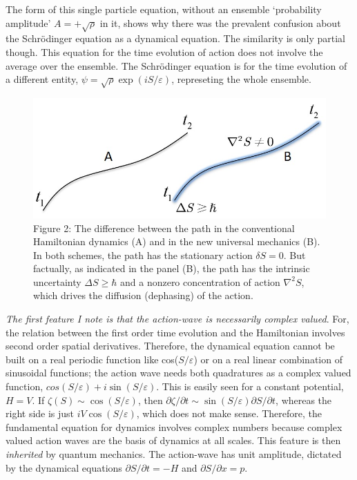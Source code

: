 The form of this single particle equation, without an ensemble `probability amplitude'
$A = + \sqrt{\rho}$ in it, shows why there was the prevalent confusion about the Schr\"{o}dinger equation
as a dynamical equation. The similarity is only partial though. This equation for the
time evolution of action does not involve the average over the ensemble. The Schr\"{o}dinger
equation is for the time evolution of a different entity, $\psi = \sqrt{\rho} \exp(iS/\varepsilon)$, represeting the
whole ensemble.
\begin{figure}[H]
\centering
\includegraphics[scale=0.65]{src/images/chap27/2.jpg}
\captionsetup{singlelinecheck = false, format= hang, justification=raggedright, font=footnotesize, labelsep=space}
\caption*{Figure 2: The difference between the path in the conventional Hamiltonian dynamics (A) and in
the new universal mechanics (B). In both schemes, the path has the stationary action $\delta S = 0$.
But factually, as indicated in the panel (B), the path has the intrinsic uncertainty $\Delta S \geq \hbar$ and a
nonzero concentration of action $\nabla^2 S$, which drives the diffusion (dephasing) of the action.}
\end{figure}

\textit{The first feature I note is that the action-wave is necessarily complex valued}. For, the relation between the first order time evolution and the Hamiltonian involves second order spatial
derivatives. Therefore, the dynamical equation cannot be built on a real periodic function
like cos($S/\varepsilon$) or on a real linear combination of sinusoidal functions; the action wave needs
both quadratures as a complex valued function, $cos(S/\varepsilon) + i \sin(S/\varepsilon)$. This is easily seen for
a constant potential, $H = V$. If $\zeta(S) \sim \cos (S/\varepsilon)$, then $\partial \zeta/\partial t \sim \sin (S/\varepsilon) \partial S/\partial t$, whereas
the right side is just $iV \cos (S/\varepsilon)$, which does not make sense. Therefore, the fundamental
equation for dynamics involves complex numbers because complex valued action waves are
the basis of dynamics at all scales. This feature is then \textit{inherited} by quantum mechanics.
The action-wave has unit amplitude, dictated by the dynamical equations $\partial S/\partial t = -H$ and
$\partial S/\partial x = p$.

